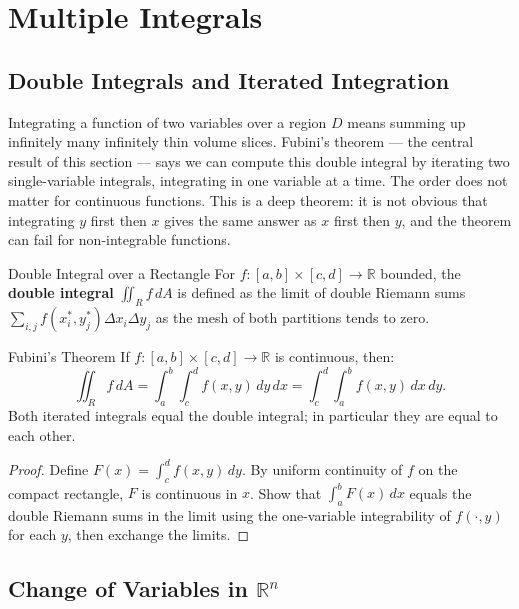 \documentclass[12pt, openany]{book}
\theoremstyle{plain}
\theoremstyle{definition}
\theoremstyle{remark}
\newcommand{\R}{\mathbb{R}}
\begin{document}
\chapter{Multiple Integrals}
\color{black}

\section{Double Integrals and Iterated Integration}

Integrating a function of two variables over a region $D$ means summing up infinitely many infinitely thin volume slices.  Fubini's theorem --- the central result of this section --- says we can compute this double integral by iterating two single-variable integrals, integrating in one variable at a time.  The order does not matter for continuous functions.  This is a deep theorem: it is not obvious that integrating $y$ first then $x$ gives the same answer as $x$ first then $y$, and the theorem can fail for non-integrable functions.

\begin{defbox}{Double Integral over a Rectangle}
For $f:[a,b]\times[c,d]\to\R$ bounded, the \textbf{double integral}
$\iint_R f\,dA$ is defined as the limit of double Riemann sums
$\sum_{i,j}f(x_i^*,y_j^*)\Delta x_i\Delta y_j$ as the mesh of both
partitions tends to zero.
\end{defbox}
\color{black}

\begin{thmbox}{Fubini's Theorem}
If $f:[a,b]\times[c,d]\to\R$ is continuous, then:
\[\iint_R f\,dA = \int_a^b\!\!\int_c^d f(x,y)\,dy\,dx
                = \int_c^d\!\!\int_a^b f(x,y)\,dx\,dy.\]
Both iterated integrals equal the double integral; in particular they are equal
to each other.
\end{thmbox}
\color{black}

\begin{proof}
Define $F(x)=\int_c^d f(x,y)\,dy$.  By uniform continuity of $f$ on the compact
rectangle, $F$ is continuous in $x$.  Show that $\int_a^b F(x)\,dx$ equals the
double Riemann sums in the limit using the one-variable integrability of $f(\cdot,y)$
for each $y$, then exchange the limits.
\end{proof}

\section{Change of Variables in $\R^n$}
\end{document}
